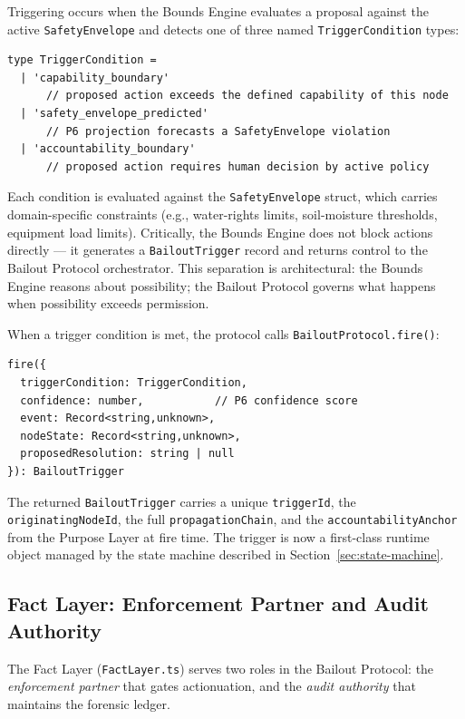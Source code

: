 Triggering occurs when the Bounds Engine evaluates a proposal against the active
\texttt{SafetyEnvelope} and detects one of three named \texttt{TriggerCondition}
types:

\begin{verbatim}
type TriggerCondition =
  | 'capability_boundary'
      // proposed action exceeds the defined capability of this node
  | 'safety_envelope_predicted'
      // P6 projection forecasts a SafetyEnvelope violation
  | 'accountability_boundary'
      // proposed action requires human decision by active policy
\end{verbatim}

Each condition is evaluated against the \texttt{SafetyEnvelope} struct, which carries
domain-specific constraints (e.g., water-rights limits, soil-moisture thresholds,
equipment load limits).  Critically, the Bounds Engine does not block actions directly ---
it generates a \texttt{BailoutTrigger} record and returns control to the Bailout Protocol
orchestrator.  This separation is architectural: the Bounds Engine reasons about
possibility; the Bailout Protocol governs what happens when possibility exceeds permission.

When a trigger condition is met, the protocol calls \texttt{BailoutProtocol.fire()}:

\begin{verbatim}
fire({
  triggerCondition: TriggerCondition,
  confidence: number,           // P6 confidence score
  event: Record<string,unknown>,
  nodeState: Record<string,unknown>,
  proposedResolution: string | null
}): BailoutTrigger
\end{verbatim}

The returned \texttt{BailoutTrigger} carries a unique \texttt{triggerId}, the
\texttt{originatingNodeId}, the full \texttt{propagationChain}, and the
\texttt{accountabilityAnchor} from the Purpose Layer at fire time.  The trigger
is now a first-class runtime object managed by the state machine described in
Section~\ref{sec:state-machine}.

\subsection{Fact Layer: Enforcement Partner and Audit Authority}

The Fact Layer (\texttt{FactLayer.ts}) serves two roles in the Bailout Protocol:
the \emph{enforcement partner} that gates actionuation, and the \emph{audit authority}
that maintains the forensic ledger.

